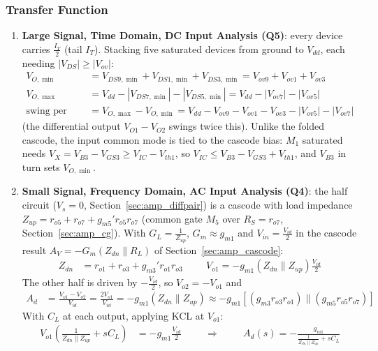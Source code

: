 \subsubsection{Transfer Function}
\begin{enumerate}
  \item \textbf{Large Signal, Time Domain, DC Input Analysis (Q5)}:
    every device carries \(\frac{I_T}{2}\) (tail \(I_T\)). Stacking five
    saturated devices from ground to \(V_{dd}\), each needing
    \(|V_{DS}| \geq |V_{ov}|\):
    \begin{align*}
      V_{O,\min} &= V_{DS9,\min} + V_{DS1,\min} + V_{DS3,\min} = V_{ov9} + V_{ov1} + V_{ov3} \\
      V_{O,\max} &= V_{dd} - |V_{DS7,\min}| - |V_{DS5,\min}| = V_{dd} - |V_{ov7}| - |V_{ov5}| \\
      \text{swing per side} &= V_{O,\max} - V_{O,\min} = V_{dd} - V_{ov9} - V_{ov1} - V_{ov3} - |V_{ov5}| - |V_{ov7}|
    \end{align*}
    (the differential output \(V_{O1} - V_{O2}\) swings twice this). Unlike the
    folded cascode, the input common mode is tied to the cascode bias: \(M_1\)
    saturated needs \(V_X = V_{B3} - V_{GS3} \geq V_{IC} - V_{th1}\), so
    \(V_{IC} \leq V_{B3} - V_{GS3} + V_{th1}\), and \(V_{B3}\) in turn sets
    \(V_{O,\min}\).
  \item \textbf{Small Signal, Frequency Domain, AC Input Analysis (Q4)}:
    the half circuit (\(V_s = 0\), Section~\ref{sec:amp_diffpair}) is a cascode
    with load impedance \(Z_{up} = r_{o5} + r_{o7} + g_{m5}' r_{o5} r_{o7}\)
    (common gate \(M_5\) over \(R_S = r_{o7}\), Section~\ref{sec:amp_cg}). With
    \(G_L = \frac{1}{Z_{up}}\), \(G_m \approx g_{m1}\) and \(V_{in} = \frac{V_{id}}{2}\)
    in the cascode result \(A_V = -G_m(Z_{dn} \parallel R_L)\) of
    Section~\ref{sec:amp_cascode}:
    \begin{align*}
      Z_{dn} &= r_{o1} + r_{o3} + g_{m3}' r_{o1} r_{o3} \hspace{1cm}
      V_{o1} = -g_{m1}(Z_{dn} \parallel Z_{up}) \frac{V_{id}}{2}
    \end{align*}
    The other half is driven by \(-\frac{V_{id}}{2}\), so \(V_{o2} = -V_{o1}\) and
    \begin{align*}
      A_d &= \frac{V_{o1} - V_{o2}}{V_{id}} = \frac{2 V_{o1}}{V_{id}} = -g_{m1}(Z_{dn} \parallel Z_{up}) \approx -g_{m1}\left[(g_{m3} r_{o3} r_{o1}) \parallel (g_{m5} r_{o5} r_{o7})\right]
    \end{align*}
    With \(C_L\) at each output, applying KCL at \(V_{o1}\):
    \begin{align*}
      V_{o1}\left(\frac{1}{Z_{dn} \parallel Z_{up}} + sC_L\right) &= -g_{m1}\frac{V_{id}}{2} \hspace{1cm} \Rightarrow \hspace{1cm}
      A_d(s) = -\frac{g_{m1}}{\frac{1}{Z_{dn} \parallel Z_{up}} + sC_L} \tag{1}
    \end{align*}
\end{enumerate}

